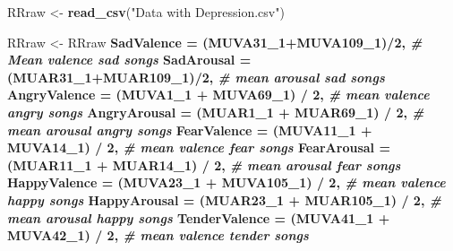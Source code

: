 \documentclass[]{article}
\newenvironment{Shaded}{\begin{snugshade}}{\end{snugshade}}
\newcommand{\CommentTok}[1]{\textcolor[rgb]{0.56,0.35,0.01}{\textit{#1}}}
\newcommand{\DataTypeTok}[1]{\textcolor[rgb]{0.13,0.29,0.53}{#1}}
\newcommand{\DecValTok}[1]{\textcolor[rgb]{0.00,0.00,0.81}{#1}}
\newcommand{\KeywordTok}[1]{\textcolor[rgb]{0.13,0.29,0.53}{\textbf{#1}}}
\newcommand{\NormalTok}[1]{#1}
\newcommand{\OperatorTok}[1]{\textcolor[rgb]{0.81,0.36,0.00}{\textbf{#1}}}
\newcommand{\StringTok}[1]{\textcolor[rgb]{0.31,0.60,0.02}{#1}}
\begin{document}
\begin{Shaded}
\begin{Highlighting}[]
\NormalTok{RRraw <-}\StringTok{ }\KeywordTok{read_csv}\NormalTok{(}\StringTok{"Data with Depression.csv"}\NormalTok{)}

\NormalTok{RRraw <-}\StringTok{ }\NormalTok{RRraw }\OperatorTok{%>%}\StringTok{ }\KeywordTok{mutate}\NormalTok{(}\DataTypeTok{id =} \KeywordTok{rownames}\NormalTok{(.), }\CommentTok{#create ID }
                          \DataTypeTok{SadValence =}\NormalTok{ (MUVA31_}\DecValTok{1}\OperatorTok{+}\NormalTok{MUVA109_}\DecValTok{1}\NormalTok{)}\OperatorTok{/}\DecValTok{2}\NormalTok{, }\CommentTok{# Mean valence sad songs}
                          \DataTypeTok{SadArousal =}\NormalTok{ (MUAR31_}\DecValTok{1}\OperatorTok{+}\NormalTok{MUAR109_}\DecValTok{1}\NormalTok{)}\OperatorTok{/}\DecValTok{2}\NormalTok{, }\CommentTok{# mean arousal sad songs}
                          \DataTypeTok{AngryValence =}\NormalTok{ (MUVA1_}\DecValTok{1} \OperatorTok{+}\StringTok{ }\NormalTok{MUVA69_}\DecValTok{1}\NormalTok{) }\OperatorTok{/}\StringTok{ }\DecValTok{2}\NormalTok{, }\CommentTok{# mean valence angry songs}
                          \DataTypeTok{AngryArousal =}\NormalTok{ (MUAR1_}\DecValTok{1} \OperatorTok{+}\StringTok{ }\NormalTok{MUAR69_}\DecValTok{1}\NormalTok{) }\OperatorTok{/}\StringTok{ }\DecValTok{2}\NormalTok{, }\CommentTok{# mean arousal angry songs}
                          \DataTypeTok{FearValence =}\NormalTok{ (MUVA11_}\DecValTok{1} \OperatorTok{+}\StringTok{ }\NormalTok{MUVA14_}\DecValTok{1}\NormalTok{) }\OperatorTok{/}\StringTok{ }\DecValTok{2}\NormalTok{, }\CommentTok{# mean valence fear songs}
                          \DataTypeTok{FearArousal =}\NormalTok{ (MUAR11_}\DecValTok{1} \OperatorTok{+}\StringTok{ }\NormalTok{MUAR14_}\DecValTok{1}\NormalTok{) }\OperatorTok{/}\StringTok{ }\DecValTok{2}\NormalTok{, }\CommentTok{# mean arousal fear songs}
                          \DataTypeTok{HappyValence =}\NormalTok{ (MUVA23_}\DecValTok{1} \OperatorTok{+}\StringTok{ }\NormalTok{MUVA105_}\DecValTok{1}\NormalTok{) }\OperatorTok{/}\StringTok{ }\DecValTok{2}\NormalTok{, }\CommentTok{# mean valence happy songs}
                          \DataTypeTok{HappyArousal =}\NormalTok{ (MUAR23_}\DecValTok{1} \OperatorTok{+}\StringTok{ }\NormalTok{MUAR105_}\DecValTok{1}\NormalTok{) }\OperatorTok{/}\StringTok{ }\DecValTok{2}\NormalTok{, }\CommentTok{# mean arousal happy songs}
                          \DataTypeTok{TenderValence =}\NormalTok{ (MUVA41_}\DecValTok{1} \OperatorTok{+}\StringTok{ }\NormalTok{MUVA42_}\DecValTok{1}\NormalTok{) }\OperatorTok{/}\StringTok{ }\DecValTok{2}\NormalTok{, }\CommentTok{# mean valence tender songs}
}
\end{Highlighting}
\end{Shaded}
\end{document}
